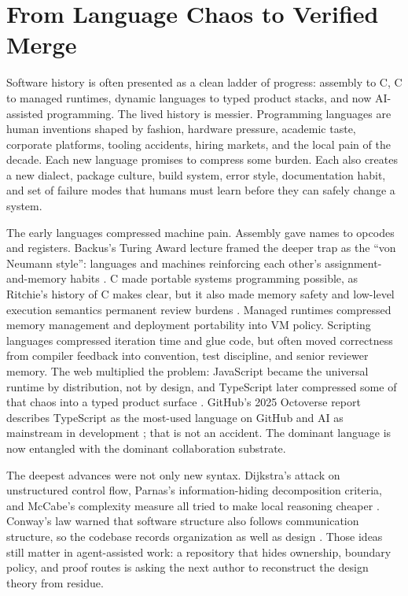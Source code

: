 \section{From Language Chaos to Verified Merge}

Software history is often presented as a clean ladder of progress: assembly to C, C to managed runtimes, dynamic languages to typed product stacks, and now AI-assisted programming. The lived history is messier. Programming languages are human inventions shaped by fashion, hardware pressure, academic taste, corporate platforms, tooling accidents, hiring markets, and the local pain of the decade. Each new language promises to compress some burden. Each also creates a new dialect, package culture, build system, error style, documentation habit, and set of failure modes that humans must learn before they can safely change a system.

The early languages compressed machine pain. Assembly gave names to opcodes and registers. Backus's Turing Award lecture framed the deeper trap as the ``von Neumann style'': languages and machines reinforcing each other's assignment-and-memory habits \cite{backusVonNeumann1978}. C made portable systems programming possible, as Ritchie's history of C makes clear, but it also made memory safety and low-level execution semantics permanent review burdens \cite{ritchieDevelopmentC1993}. Managed runtimes compressed memory management and deployment portability into VM policy. Scripting languages compressed iteration time and glue code, but often moved correctness from compiler feedback into convention, test discipline, and senior reviewer memory. The web multiplied the problem: JavaScript became the universal runtime by distribution, not by design, and TypeScript later compressed some of that chaos into a typed product surface \cite{typescript70Beta2026}. GitHub's 2025 Octoverse report describes TypeScript as the most-used language on GitHub and AI as mainstream in development \cite{githubOctoverse2025}; that is not an accident. The dominant language is now entangled with the dominant collaboration substrate.

The deepest advances were not only new syntax. Dijkstra's attack on unstructured control flow, Parnas's information-hiding decomposition criteria, and McCabe's complexity measure all tried to make local reasoning cheaper \cite{dijkstraGoto1968,parnasDecomposition1972,mccabeComplexity1976}. Conway's law warned that software structure also follows communication structure, so the codebase records organization as well as design \cite{conwayCommittees1968}. Those ideas still matter in agent-assisted work: a repository that hides ownership, boundary policy, and proof routes is asking the next author to reconstruct the design theory from residue.

